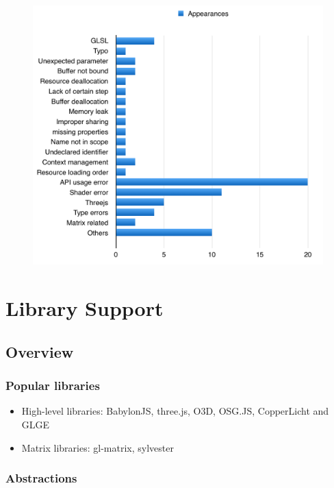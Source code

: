 \documentclass[]{article}
\begin{document}
\begin{figure}[htbp]
\centering
\includegraphics{images/apperances.png}
\end{figure}

\newpage
\section{Library Support}\label{library-support}

\subsection{Overview}\label{overview-2}

\subsubsection{Popular libraries}\label{popular-libraries}

\begin{itemize}
\itemsep1pt\parskip0pt
\item
  High-level libraries: BabylonJS, three.js, O3D, OSG.JS, CopperLicht
  and GLGE
\item
  Matrix libraries: gl-matrix, sylvester
\end{itemize}

\subsubsection{Abstractions}\label{abstractions}
\end{document}
